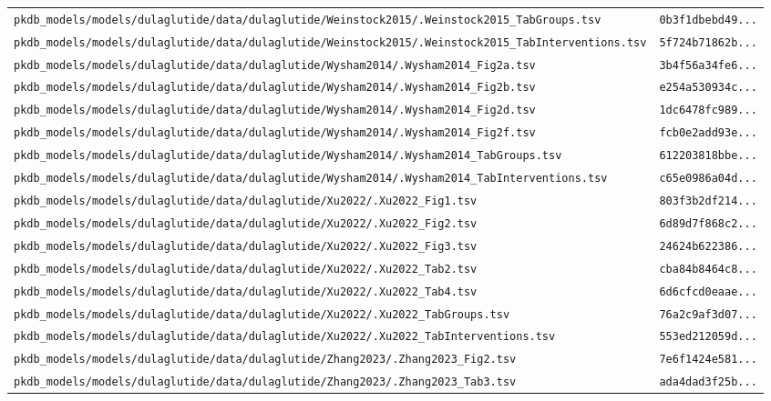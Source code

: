 \begin{longtable}{ll}
\texttt{pkdb\_models/models/dulaglutide/data/dulaglutide/Weinstock2015/.Weinstock2015\_TabGroups.tsv} & \texttt{0b3f1dbebd49...} \\
\texttt{pkdb\_models/models/dulaglutide/data/dulaglutide/Weinstock2015/.Weinstock2015\_TabInterventions.tsv} & \texttt{5f724b71862b...} \\
\texttt{pkdb\_models/models/dulaglutide/data/dulaglutide/Wysham2014/.Wysham2014\_Fig2a.tsv} & \texttt{3b4f56a34fe6...} \\
\texttt{pkdb\_models/models/dulaglutide/data/dulaglutide/Wysham2014/.Wysham2014\_Fig2b.tsv} & \texttt{e254a530934c...} \\
\texttt{pkdb\_models/models/dulaglutide/data/dulaglutide/Wysham2014/.Wysham2014\_Fig2d.tsv} & \texttt{1dc6478fc989...} \\
\texttt{pkdb\_models/models/dulaglutide/data/dulaglutide/Wysham2014/.Wysham2014\_Fig2f.tsv} & \texttt{fcb0e2add93e...} \\
\texttt{pkdb\_models/models/dulaglutide/data/dulaglutide/Wysham2014/.Wysham2014\_TabGroups.tsv} & \texttt{612203818bbe...} \\
\texttt{pkdb\_models/models/dulaglutide/data/dulaglutide/Wysham2014/.Wysham2014\_TabInterventions.tsv} & \texttt{c65e0986a04d...} \\
\texttt{pkdb\_models/models/dulaglutide/data/dulaglutide/Xu2022/.Xu2022\_Fig1.tsv} & \texttt{803f3b2df214...} \\
\texttt{pkdb\_models/models/dulaglutide/data/dulaglutide/Xu2022/.Xu2022\_Fig2.tsv} & \texttt{6d89d7f868c2...} \\
\texttt{pkdb\_models/models/dulaglutide/data/dulaglutide/Xu2022/.Xu2022\_Fig3.tsv} & \texttt{24624b622386...} \\
\texttt{pkdb\_models/models/dulaglutide/data/dulaglutide/Xu2022/.Xu2022\_Tab2.tsv} & \texttt{cba84b8464c8...} \\
\texttt{pkdb\_models/models/dulaglutide/data/dulaglutide/Xu2022/.Xu2022\_Tab4.tsv} & \texttt{6d6cfcd0eaae...} \\
\texttt{pkdb\_models/models/dulaglutide/data/dulaglutide/Xu2022/.Xu2022\_TabGroups.tsv} & \texttt{76a2c9af3d07...} \\
\texttt{pkdb\_models/models/dulaglutide/data/dulaglutide/Xu2022/.Xu2022\_TabInterventions.tsv} & \texttt{553ed212059d...} \\
\texttt{pkdb\_models/models/dulaglutide/data/dulaglutide/Zhang2023/.Zhang2023\_Fig2.tsv} & \texttt{7e6f1424e581...} \\
\texttt{pkdb\_models/models/dulaglutide/data/dulaglutide/Zhang2023/.Zhang2023\_Tab3.tsv} & \texttt{ada4dad3f25b...} \\

\end{longtable}
